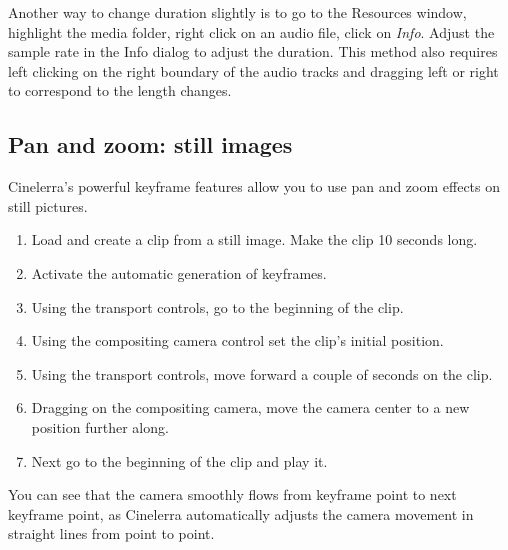 Another way to change duration slightly is to go to the Resources window, highlight the media folder, right click on an audio file, click on \textit{Info}. Adjust the sample rate in the Info dialog to adjust the duration. This method also requires left clicking on the right boundary of the audio tracks and dragging left or right to correspond to the length changes.

\subsection{Pan and zoom: still images}%
\label{sub:pan_zoom_still_image}

Cinelerra's powerful keyframe features allow you to use pan and zoom effects on still pictures.

\begin{enumerate}
	\item Load and create a clip from a still image. Make the clip 10 seconds long.
	\item Activate the automatic generation of keyframes.
	\item Using the transport controls, go to the beginning of the clip.
	\item Using the compositing camera control set the clip's initial position.
	\item Using the transport controls, move forward a couple of seconds on the clip.
	\item Dragging on the compositing camera, move the camera center to a new position further along.
	\item Next go to the beginning of the clip and play it.
\end{enumerate}

You can see that the camera smoothly flows from keyframe point to next keyframe point, as Cinelerra automatically adjusts the camera movement in straight lines from point to point.

